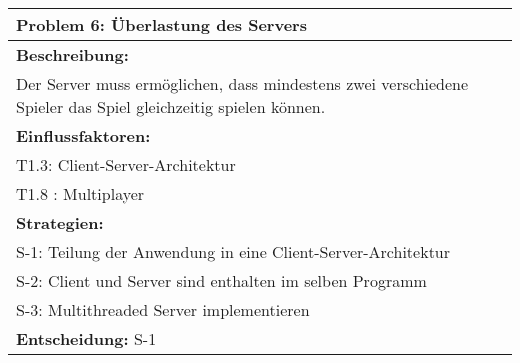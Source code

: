 \documentclass[fontsize=12pt,paper=a4,twoside]{scrartcl}
\begin{document}
\begin{longtable}{|p{15cm}|}
\hline
Problem 6: Überlastung des Servers                                                                           
\\ \hline                                                                                                                                                                                                                                                                                                                                                                                                                                                                                                                                                        
\textbf{Beschreibung:} \\
Der Server muss ermöglichen, dass mindestens zwei verschiedene Spieler das Spiel gleichzeitig spielen können.
\\ \hline
\textbf{Einflussfaktoren:} \\
T1.3: Client-Server-Architektur \\
T1.8 : Multiplayer
\\ \hline
\textbf{Strategien:} \\
S-1: Teilung der Anwendung in eine Client-Server-Architektur \\
S-2: Client und Server sind enthalten im selben Programm \\
S-3: Multithreaded Server implementieren
 \\ \hline
 \textbf{Entscheidung:} S-1
\\ \hline
\end{longtable}
\newpage
\end{document}
